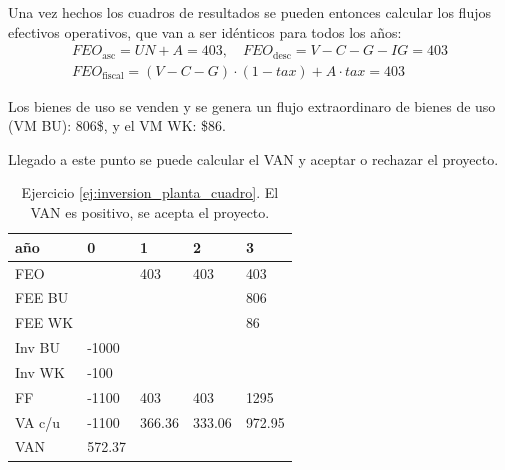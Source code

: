 \documentclass[twocolumn,10pt]{article}
\begin{document}
Una vez hechos los cuadros de resultados se pueden entonces calcular los flujos efectivos operativos, que van a ser idénticos para todos los años:
\begin{gather*}
	FEO_{\text{asc}} = UN+A = 403, \quad FEO_{\text{desc}} = V-C-G-IG = 403 \\
	FEO_{\text{fiscal}} = (V-C-G)\cdot(1-tax) + A\cdot tax = 403
\end{gather*}

Los bienes de uso se venden y se genera un flujo extraordinaro de bienes de uso (VM BU): 806\$, y el VM WK: \$86.

Llegado a este punto se puede calcular el VAN y aceptar o rechazar el proyecto.

\begin{table}[htb]
	\centering
	\caption{Ejercicio \ref{ej:inversion_planta_cuadro}. El VAN es positivo, se acepta el proyecto.}
	\begin{tabular}{l|llll}
	\textbf{año} & \textbf{0} & 1      & 2      & 3      \\ \hline
	FEO          &            & 403    & 403    & 403    \\
	FEE BU       &            &        &        & 806    \\ 
	FEE WK       &            &        &        & 86     \\
	Inv BU       & -1000      &        &        &        \\
	Inv WK       & -100       &        &        &        \\ \hline
	FF           & -1100      & 403    & 403    & 1295   \\
	VA c/u       & -1100      & 366.36 & 333.06 & 972.95 \\ \hline
	VAN          & 572.37     &        &        &       
	\end{tabular}
\end{table}
\end{document}

